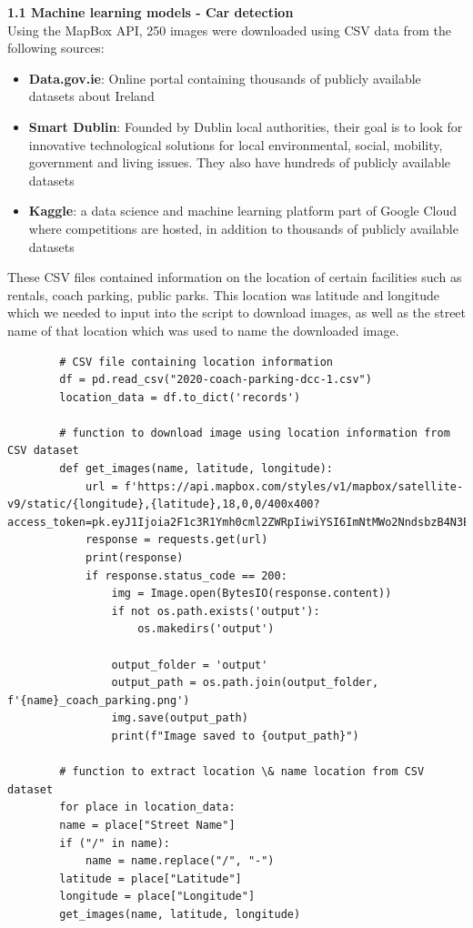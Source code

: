 \textbf{1.1 Machine learning models - Car detection}\\
Using the MapBox API, 250 images were downloaded using CSV data from the following sources:
\begin{itemize}
    \item \textbf{Data.gov.ie}: Online portal containing thousands of publicly available datasets about Ireland
    \item \textbf{Smart Dublin}: Founded by Dublin local authorities, their goal is to look for innovative technological solutions for local environmental, social, mobility, government and living issues. They also have hundreds of publicly available datasets
    \item \textbf{Kaggle}: a data science and machine learning platform part of Google Cloud where competitions are hosted, in addition to thousands of publicly available datasets
\end{itemize}
These CSV files contained information on the location of certain facilities such as rentals, coach parking, public parks. This location was latitude and longitude which we needed to input into the script to download images, as well as the street name of that location which was used to name the downloaded image.
\begin{listing}[h!]
    \centering
    \begin{verbatim}
        # CSV file containing location information
        df = pd.read_csv("2020-coach-parking-dcc-1.csv")
        location_data = df.to_dict('records')

        # function to download image using location information from CSV dataset
        def get_images(name, latitude, longitude):
            url = f'https://api.mapbox.com/styles/v1/mapbox/satellite-v9/static/{longitude},{latitude},18,0,0/400x400?access_token=pk.eyJ1Ijoia2F1c3R1Ymh0cml2ZWRpIiwiYSI6ImNtMWo2NndsbzB4N3EycHM1aGF2cDd5NzkifQ.4aegzX6Kfy3zW8pHkLWU7Q'
            response = requests.get(url)
            print(response)
            if response.status_code == 200:
                img = Image.open(BytesIO(response.content))
                if not os.path.exists('output'):
                    os.makedirs('output')

                output_folder = 'output'
                output_path = os.path.join(output_folder, f'{name}_coach_parking.png')
                img.save(output_path)
                print(f"Image saved to {output_path}")

        # function to extract location \& name location from CSV dataset
        for place in location_data:
        name = place["Street Name"]
        if ("/" in name):
            name = name.replace("/", "-")
        latitude = place["Latitude"]
        longitude = place["Longitude"]
        get_images(name, latitude, longitude)
    \end{verbatim}
\end{listing}\\
